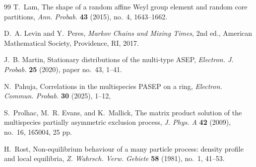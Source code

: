 \documentclass[11pt,a4paper]{amsart}
\theoremstyle{definition}
\theoremstyle{remark}
\numberwithin{equation}{section}
\begin{document}
\begin{thebibliography}{99}
		T.~Lam,
		The shape of a random affine Weyl group element and random core partitions,
		\emph{Ann. Probab.} \textbf{43} (2015), no.~4, 1643--1662.
		
		D.~A. Levin and Y.~Peres,
		\emph{Markov Chains and Mixing Times}, 2nd ed.,
		American Mathematical Society, Providence, RI, 2017.
		
		J.~B. Martin,
		Stationary distributions of the multi-type ASEP,
		\emph{Electron. J. Probab.} \textbf{25} (2020), paper no.~43, 1--41.
		
		N.~Pahuja,
		Correlations in the multispecies PASEP on a ring,
		\emph{Electron. Commun. Probab.} \textbf{30} (2025), 1--12,
		
		S.~Prolhac, M.~R. Evans, and K.~Mallick,
		The matrix product solution of the multispecies partially asymmetric
		exclusion process,
		\emph{J. Phys. A} \textbf{42} (2009), no.~16, 165004, 25 pp.
		
		H.~Rost,
		Non-equilibrium behaviour of a many particle process: density profile and
		local equilibria,
		\emph{Z. Wahrsch. Verw. Gebiete} \textbf{58} (1981), no.~1, 41--53.
		
	\end{thebibliography}
	
\end{document}
